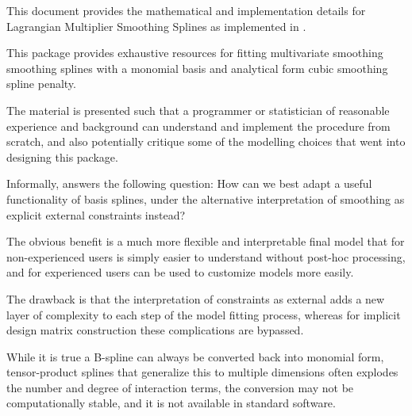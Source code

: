 %
\begin{Description}
This document provides the mathematical and implementation details for
Lagrangian Multiplier Smoothing Splines as implemented in .

This package provides exhaustive resources for fitting multivariate smoothing
smoothing splines with a monomial basis and analytical form cubic smoothing
spline penalty.

The material is presented such that a programmer or statistician of
reasonable experience and background can understand and implement the
procedure from scratch, and also potentially critique some of the modelling
choices that went into designing this package.

Informally,  answers the following question:
How can we best adapt a useful functionality of basis splines, under the
alternative interpretation of smoothing as explicit external constraints instead?

The obvious benefit is a much more flexible and interpretable final model that for
non-experienced users is simply easier to understand without post-hoc processing, and
for experienced users can be used to customize models more easily.

The drawback is that the interpretation of constraints as external adds a new layer of complexity
to each step of the model fitting process, whereas for implicit design matrix
construction these complications are bypassed.

While it is true a B-spline can always be converted back into monomial form,
tensor-product splines that generalize this to multiple dimensions often
explodes the number and degree of interaction terms, the conversion may not
be computationally stable, and it is not available in standard software.
\end{Description}
%
